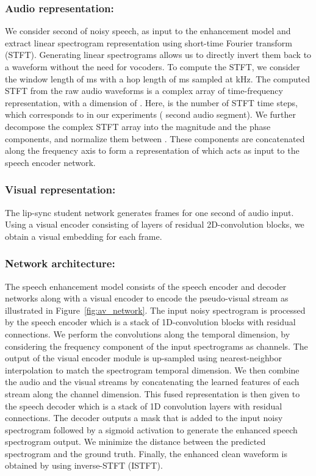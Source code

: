 \documentclass[10pt,twocolumn,letterpaper]{article}
\begin{document}
\subsubsection{Audio representation:} We consider  second of noisy speech,  as input to the enhancement model and extract linear spectrogram representation using short-time Fourier
transform (STFT). Generating linear spectrograms allows us to directly invert them back to a waveform without the need for vocoders. To compute the STFT, we consider the window length of ms with a hop length of ms sampled at kHz. The computed STFT from the raw audio waveforms is a complex array of time-frequency representation, with a dimension of . Here,  is the number of STFT time steps, which corresponds to  in our experiments ( second audio segment). We further decompose the complex STFT array into the magnitude and the phase components, and normalize them between . These components are concatenated along the frequency axis to form a representation of  which acts as input to the speech encoder network. 

\vspace{-10pt}
\subsubsection{Visual representation:} The lip-sync student network generates  frames for one second of audio input. Using a visual encoder consisting of  layers of residual 2D-convolution blocks, we obtain a visual embedding for each frame. 

\vspace{-10pt}
\subsubsection{Network architecture:} The speech enhancement model consists of the speech encoder and decoder networks along with a visual encoder to encode the pseudo-visual stream as illustrated in Figure~\ref{fig:av_network}. 
The input noisy spectrogram is processed by the speech encoder which is a stack of  1D-convolution blocks with residual connections. We perform the convolutions along the temporal dimension, by considering the frequency component of the input spectrograms as channels. The output of the visual encoder module is up-sampled  using nearest-neighbor interpolation to match the spectrogram temporal dimension. We then combine the audio and the visual streams by concatenating the learned features of each stream along the channel dimension. This fused representation is then given to the speech decoder which is a stack of  1D convolution layers with residual connections. The decoder outputs a mask that is added to the input noisy spectrogram followed by a sigmoid activation to generate the enhanced speech spectrogram output. We minimize the  distance between the predicted spectrogram and the ground truth. Finally, the enhanced clean waveform is obtained by using inverse-STFT (ISTFT). 
 
\end{document}

